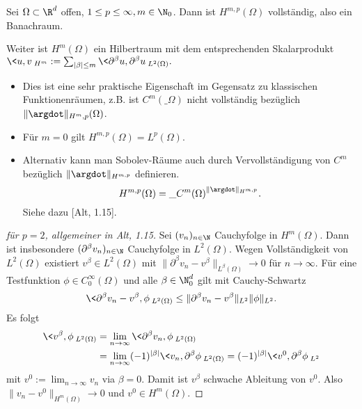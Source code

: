\begin{st} \label{3.5}
	Sei $\Omega \subset \R^d$ offen, $1 \le p \le \infty, m \in \N_0$.
	Dann ist $H^{m,p}(\Omega)$ vollständig, also ein Banachraum.

	Weiter ist $H^m(\Omega)$ ein Hilbertraum mit dem entsprechenden Skalarprodukt
	\begin{math}
		\<u,v\>_{H^m} := \sum_{|\beta| \le m} \<\partial^\beta u, \partial^\beta u\>_{L^2(\Omega)}.
	\end{math}
	\begin{note}
		\begin{itemize}
			\item
				Dies ist eine sehr praktische Eigenschaft im Gegensatz zu klassischen Funktionenräumen, z.B. ist $C^m(\_\Omega)$ nicht vollständig bezüglich $\|\argdot\|_{H^m,p}(\Omega)$.
			\item
				Für $m = 0$ gilt $H^{m,p}(\Omega) = L^p(\Omega)$.
			\item
				Alternativ kann man Sobolev-Räume auch durch Vervollständigung von $C^m$ bezüglich $\|\argdot\|_{H^{m,p}}$ definieren.
				\[
					H^{m,p}(\Omega) = \_{C^m(\Omega)}^{\|\argdot\|_{H^{m,p}}}.
				\]
				Siehe dazu [Alt, 1.15].
		\end{itemize}
	\end{note}
	\begin{proof}[für $p=2$, allgemeiner in Alt, 1.15]
		Sei $(v_n)_{n\in\N}$ Cauchyfolge in $H^m(\Omega)$.
		Dann ist insbesondere $(\partial^\beta v_n)_{n\in\N}$ Cauchyfolge in $L^2(\Omega)$.
		Wegen Vollständigkeit von $L^2(\Omega)$ existiert $v^\beta \in L^2(\Omega)$ mit $\|\partial^\beta v_n - v^\beta\|_{L^\beta(\Omega)} \to 0$ für $n \to \infty$.
		Für eine Testfunktion $\phi \in C_0^\infty(\Omega)$ und alle $\beta \in \N_0^d$ gilt mit Cauchy-Schwartz
		\begin{align*}
			\<\partial^\beta v_n - v^\beta, \phi\>_{L^2(\Omega)}
			\le \|\partial^\beta v_n - v^\beta\|_{L^2}\|\phi\|_{L^2}.
		\end{align*}
		Es folgt
		\begin{align*}
			\<v^\beta, \phi\>_{L^2(\Omega)}
			&= \lim_{n\to\infty} \<\partial^\beta v_n, \phi\>_{L^2(\Omega)} \\
			&= \lim_{n\to\infty} (-1)^{|\beta|} \<v_n, \partial^\beta \phi\>_{L^2(\Omega)}
			= (-1)^{|\beta|} \<v^0, \partial^\beta \phi\>_{L^2}
		\end{align*}
		mit $v^0 := \lim_{n\to\infty} v_n$ via $\beta = 0$.
		Damit ist $v^\beta$ schwache Ableitung von $v^0$.
		Also $\|v_n - v^0\|_{H^m(\Omega)} \to 0$ und $v^0 \in H^m(\Omega)$.
	\end{proof}
\end{st}

